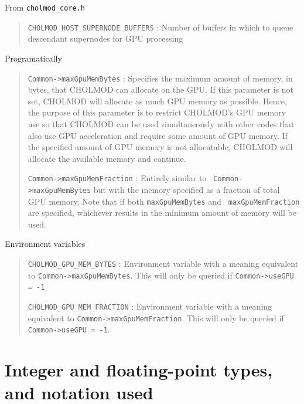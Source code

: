\documentclass[11pt]{article}
\begin{document}
From {\tt cholmod\_core.h}

\begin{quote}
  {\tt CHOLMOD\_HOST\_SUPERNODE\_BUFFERS} : Number of buffers in which to queue
  descendant supernodes for GPU processing

\end{quote}

Programatically

\begin{quote}

  {\tt Common->maxGpuMemBytes} : Specifies the maximum amount of memory, in
  bytes, that CHOLMOD can allocate on the GPU.  If this parameter is not set,
  CHOLMOD will allocate as much GPU memory as possible.  Hence, the purpose of
  this parameter is to restrict CHOLMOD's GPU memory use so that CHOLMOD can be
  used simultaneously with other codes that also use GPU acceleration and
  require some amount of GPU memory.  If the specified amount of GPU memory is
  not allocatable, CHOLMOD will allocate the available memory and continue.

  {\tt Common->maxGpuMemFraction} : Entirely similar to {\tt
  Common->maxGpuMemBytes} but with the memory specified as a fraction of total
  GPU memory.  Note that if both {\tt maxGpuMemBytes} and {\tt
  maxGpuMemFraction} are specified, whichever results in the minimum amount of
  memory will be used.

\end{quote}

Environment variables

\begin{quote}
  {\tt CHOLMOD\_GPU\_MEM\_BYTES} : Environment variable with a meaning
  equivalent to {\tt Common->maxGpuMemBytes}.  This will only be queried if
  {\tt Common->useGPU = -1}.

  {\tt CHOLMOD\_GPU\_MEM\_FRACTION} : Environment variable with a meaning
  equivalent to {\tt Common->maxGpuMemFraction}.  This will only be queried if
  {\tt Common->useGPU = -1}.

\end{quote}

\newpage \section{Integer and floating-point types, and notation used}
\end{document}
